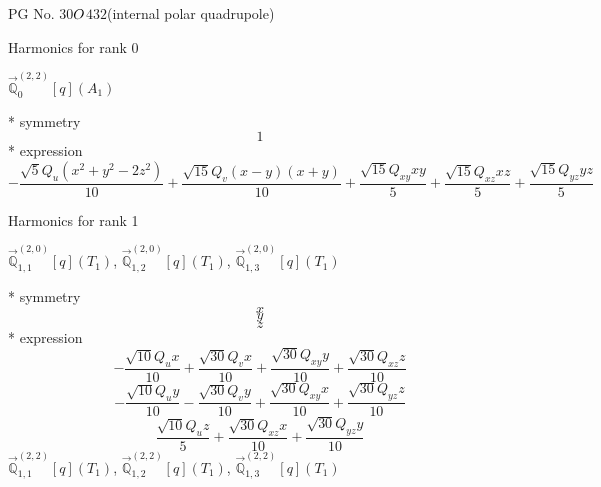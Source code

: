 \documentclass[fleqn,8pt]{jsarticle}
\begin{document}
\setcounter{MaxMatrixCols}{32}

\renewcommand{\tablename}{Table~}
\renewcommand{\figurename}{Figure~}
\begin{center}
\LARGE
PG No. 30\quad$O_{\rm }$\quad$432$\quad[ cubic ] (internal polar quadrupole)
\end{center}

\noindent * Harmonics for rank 0

\noindent\quad $\vec{\mathbb{Q}}_{0}^{(2,2)}[q](A_{1})$

\noindent\quad ** symmetry
\begin{dmath*}
1
\end{dmath*}
\noindent\quad ** expression
\begin{dmath*}
- \frac{\sqrt{5} Q_{u} \left(x^{2} + y^{2} - 2 z^{2}\right)}{10} + \frac{\sqrt{15} Q_{v} \left(x - y\right) \left(x + y\right)}{10} + \frac{\sqrt{15} Q_{xy} x y}{5} + \frac{\sqrt{15} Q_{xz} x z}{5} + \frac{\sqrt{15} Q_{yz} y z}{5}
\end{dmath*}

\noindent * Harmonics for rank 1

\noindent\quad $\vec{\mathbb{Q}}_{1,1}^{(2,0)}[q](T_{1})$, $\vec{\mathbb{Q}}_{1,2}^{(2,0)}[q](T_{1})$, $\vec{\mathbb{Q}}_{1,3}^{(2,0)}[q](T_{1})$

\noindent\quad ** symmetry
\begin{dmath*}
x
\end{dmath*}
\begin{dmath*}
y
\end{dmath*}
\begin{dmath*}
z
\end{dmath*}
\noindent\quad ** expression
\begin{dmath*}
- \frac{\sqrt{10} Q_{u} x}{10} + \frac{\sqrt{30} Q_{v} x}{10} + \frac{\sqrt{30} Q_{xy} y}{10} + \frac{\sqrt{30} Q_{xz} z}{10}
\end{dmath*}
\begin{dmath*}
- \frac{\sqrt{10} Q_{u} y}{10} - \frac{\sqrt{30} Q_{v} y}{10} + \frac{\sqrt{30} Q_{xy} x}{10} + \frac{\sqrt{30} Q_{yz} z}{10}
\end{dmath*}
\begin{dmath*}
\frac{\sqrt{10} Q_{u} z}{5} + \frac{\sqrt{30} Q_{xz} x}{10} + \frac{\sqrt{30} Q_{yz} y}{10}
\end{dmath*}
\noindent\quad $\vec{\mathbb{Q}}_{1,1}^{(2,2)}[q](T_{1})$, $\vec{\mathbb{Q}}_{1,2}^{(2,2)}[q](T_{1})$, $\vec{\mathbb{Q}}_{1,3}^{(2,2)}[q](T_{1})$
\end{document}

